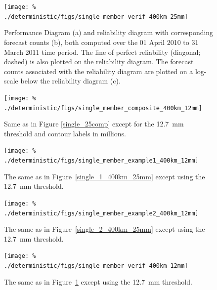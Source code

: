 \clearpage
\begin{figure}[cc]
    \centering
    \texttt{[image: \%
    ./deterministic/figs/single\_member\_verif\_400km\_25mm]}\\
    \caption{Performance Diagram (a) and reliability diagram with corresponding forecast counts (b), both computed over the 01 April 2010 to 31 March 2011 time period.
    The line of perfect reliability (diagonal; dashed) is also plotted on the reliability diagram.
    The forecast counts associated with the reliability diagram are plotted on a log-scale below the reliability diagram (c).}
    \label{single_verif_400km_25mm}
\end{figure}


\clearpage
\begin{figure}[cc]
    \centering
    \texttt{[image: \%
    ./deterministic/figs/single\_member\_composite\_400km\_12mm]}\\
    \caption{Same as in Figure \ref{single_25comp} except for the \mbox{12.7 mm} threshold and contour labels in millions.}

    \label{single_12comp}
\end{figure}


\clearpage
\begin{figure}[cc]
    \centering
    \texttt{[image: \%
    ./deterministic/figs/single\_member\_example1\_400km\_12mm]}\\
    \caption{The same as in \mbox{Figure \ref{single_1_400km_25mm}} except using the \mbox{12.7 mm} threshold.}
    \label{single_1_400km_12mm}
\end{figure}


\clearpage
\begin{figure}[cc]
    \centering
    \texttt{[image: \%
    ./deterministic/figs/single\_member\_example2\_400km\_12mm]}\\
    \caption{The same as in \mbox{Figure \ref{single_2_400km_25mm}} except using the \mbox{12.7 mm} threshold.}
    \label{single_2_400km_12mm}
\end{figure}


\clearpage
\begin{figure}[cc]
    \centering
    \texttt{[image: \%
    ./deterministic/figs/single\_member\_verif\_400km\_12mm]}\\
    \caption{The same as in \mbox{Figure \ref{single_verif_400km_25mm}} except using the \mbox{12.7 mm} threshold.}
    \label{single_verif_400km_12mm}
\end{figure}





